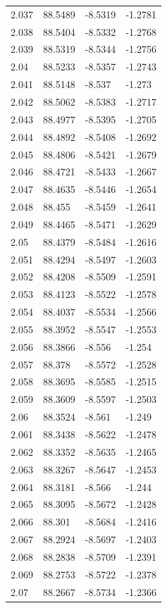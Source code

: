 \begin{tabular}{llll}
2.037 & 88.5489 & -8.5319 & -1.2781 \\
2.038 & 88.5404 & -8.5332 & -1.2768 \\
2.039 & 88.5319 & -8.5344 & -1.2756 \\
2.04 & 88.5233 & -8.5357 & -1.2743 \\
2.041 & 88.5148 & -8.537 & -1.273 \\
2.042 & 88.5062 & -8.5383 & -1.2717 \\
2.043 & 88.4977 & -8.5395 & -1.2705 \\
2.044 & 88.4892 & -8.5408 & -1.2692 \\
2.045 & 88.4806 & -8.5421 & -1.2679 \\
2.046 & 88.4721 & -8.5433 & -1.2667 \\
2.047 & 88.4635 & -8.5446 & -1.2654 \\
2.048 & 88.455 & -8.5459 & -1.2641 \\
2.049 & 88.4465 & -8.5471 & -1.2629 \\
2.05 & 88.4379 & -8.5484 & -1.2616 \\
2.051 & 88.4294 & -8.5497 & -1.2603 \\
2.052 & 88.4208 & -8.5509 & -1.2591 \\
2.053 & 88.4123 & -8.5522 & -1.2578 \\
2.054 & 88.4037 & -8.5534 & -1.2566 \\
2.055 & 88.3952 & -8.5547 & -1.2553 \\
2.056 & 88.3866 & -8.556 & -1.254 \\
2.057 & 88.378 & -8.5572 & -1.2528 \\
2.058 & 88.3695 & -8.5585 & -1.2515 \\
2.059 & 88.3609 & -8.5597 & -1.2503 \\
2.06 & 88.3524 & -8.561 & -1.249 \\
2.061 & 88.3438 & -8.5622 & -1.2478 \\
2.062 & 88.3352 & -8.5635 & -1.2465 \\
2.063 & 88.3267 & -8.5647 & -1.2453 \\
2.064 & 88.3181 & -8.566 & -1.244 \\
2.065 & 88.3095 & -8.5672 & -1.2428 \\
2.066 & 88.301 & -8.5684 & -1.2416 \\
2.067 & 88.2924 & -8.5697 & -1.2403 \\
2.068 & 88.2838 & -8.5709 & -1.2391 \\
2.069 & 88.2753 & -8.5722 & -1.2378 \\
2.07 & 88.2667 & -8.5734 & -1.2366 \\

\end{tabular}
